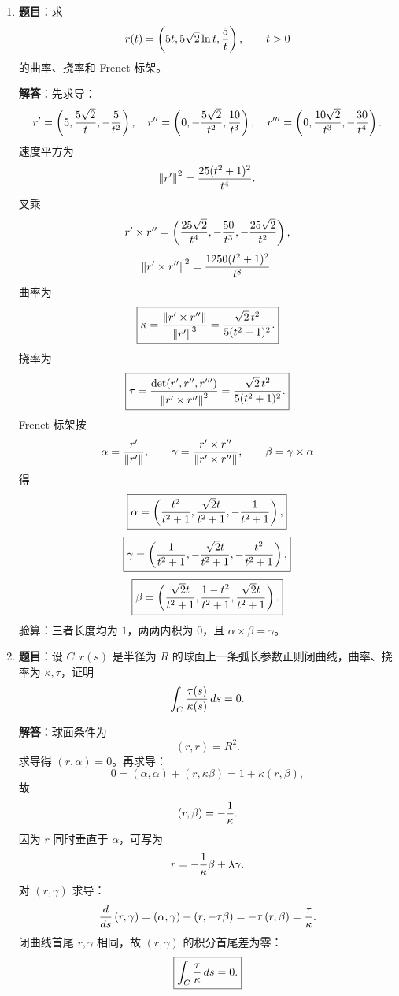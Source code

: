 \documentclass[UTF8,12pt,a4paper]{ctexart}
\newcommand{\vct}[1]{\boldsymbol{#1}}
\newcommand{\norm}[1]{\left\lVert #1\right\rVert}
\newcommand{\inner}[2]{\left(#1,#2\right)}
\begin{document}
\begin{enumerate}
\textbf{解答}：
\begin{enumerate}
\item $\boxed{A_iB^iC^2}$。
\item 因 $\vct c=2\vct b$，故 $\vct b\times\vct c=0$，答案为 $\boxed{0}$。
\item 若沿用上一空数据，仍为 $\boxed{0}$。若为任意三向量，则三个混合积循环相等，总和为 $3\vct a\cdot(\vct b\times\vct c)$。
\item 物理意义：只受曲面约束力的自由质点轨迹。几何意义：切向量沿自身平行，局部最短。
\item 对偶。
\item 看单位切向 $\alpha$ 的导数极限是否存在，或等价看主法向极限是否可定义。
\item 短。
\item $R_{1221},R_{2112}$，符号由教材曲率张量约定决定。
\end{enumerate}

\item \textbf{题目}：求
\[
r(t)=\left(5t,5\sqrt2\ln t,{5\over t}\right),\qquad t>0
\]
的曲率、挠率和 Frenet 标架。

\textbf{解答}：先求导：
\[
r'=\left(5,{5\sqrt2\over t},-{5\over t^2}\right),\quad
r''=\left(0,-{5\sqrt2\over t^2},{10\over t^3}\right),\quad
r'''=\left(0,{10\sqrt2\over t^3},-{30\over t^4}\right).
\]
速度平方为
\[
\norm{r'}^2={25(t^2+1)^2\over t^4}.
\]
叉乘
\[
r'\times r''=\left({25\sqrt2\over t^4},-{50\over t^3},-{25\sqrt2\over t^2}\right),
\]
\[
\norm{r'\times r''}^2={1250(t^2+1)^2\over t^8}.
\]
曲率为
\[
\boxed{\kappa={\norm{r'\times r''}\over\norm{r'}^3}
={\sqrt2\,t^2\over5(t^2+1)^2}.}
\]
挠率为
\[
\boxed{\tau={\det(r',r'',r''')\over\norm{r'\times r''}^2}
={\sqrt2\,t^2\over5(t^2+1)^2}.}
\]
Frenet 标架按
\[
\alpha={r'\over\norm{r'}},\qquad
\gamma={r'\times r''\over\norm{r'\times r''}},\qquad
\beta=\gamma\times\alpha
\]
得
\[
\boxed{\alpha=\left({t^2\over t^2+1},{\sqrt2t\over t^2+1},-{1\over t^2+1}\right),}
\]
\[
\boxed{\gamma=\left({1\over t^2+1},-{\sqrt2t\over t^2+1},-{t^2\over t^2+1}\right),}
\]
\[
\boxed{\beta=\left({\sqrt2t\over t^2+1},{1-t^2\over t^2+1},{\sqrt2t\over t^2+1}\right).}
\]
验算：三者长度均为 $1$，两两内积为 $0$，且 $\alpha\times\beta=\gamma$。

\item \textbf{题目}：设 $C:r(s)$ 是半径为 $R$ 的球面上一条弧长参数正则闭曲线，曲率、挠率为 $\kappa,\tau$，证明
\[
\int_C{\tau(s)\over\kappa(s)}\,ds=0.
\]

\textbf{解答}：球面条件为
\[
\inner{r}{r}=R^2.
\]
求导得 $\inner{r}{\alpha}=0$。再求导：
\[
0=\inner{\alpha}{\alpha}+\inner{r}{\kappa\beta}
=1+\kappa\inner{r}{\beta},
\]
故
\[
\inner{r}{\beta}=-{1\over\kappa}.
\]
因为 $r$ 同时垂直于 $\alpha$，可写为
\[
r=-{1\over\kappa}\beta+\lambda\gamma.
\]
对 $\inner{r}{\gamma}$ 求导：
\[
{d\over ds}\inner{r}{\gamma}
=\inner{\alpha}{\gamma}+\inner{r}{-\tau\beta}
=-\tau\inner{r}{\beta}
={\tau\over\kappa}.
\]
闭曲线首尾 $r,\gamma$ 相同，故 $\inner{r}{\gamma}$ 的积分首尾差为零：
\[
\boxed{\int_C{\tau\over\kappa}\,ds=0.}
\]


\end{enumerate}
\end{document}
